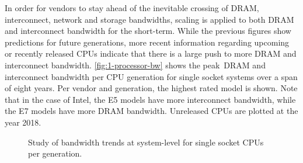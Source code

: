 
In order for vendors to stay ahead of the inevitable crossing of DRAM, interconnect, network and storage bandwidths, scaling is applied to both DRAM and interconnect bandwidth for the short-term. While the previous figures show predictions for future generations, more recent information regarding upcoming or recently released CPUs indicate that there is a large push to more DRAM and interconnect bandwidth. \autoref{fig:1-processor-bw} shows the peak\footnotemark~DRAM and interconnect bandwidth per CPU generation for single socket systems over a span of eight years. Per vendor and generation, the highest rated model is shown. Note that in the case of Intel, the E5 models have more interconnect bandwidth, while the E7 models have more DRAM bandwidth. Unreleased CPUs are plotted at the year 2018.



\begin{figure}[htb!]
  {\caption{Study of bandwidth trends at system-level for single socket CPUs per generation.}\label{fig:1-processor-bw}}
\end{figure}



